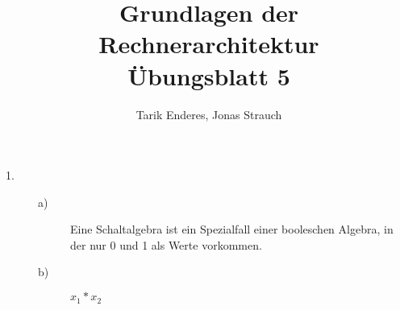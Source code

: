 \documentclass[12pt,a4paper]{scrartcl}
\begin{document}
	\title{Grundlagen der Rechnerarchitektur\\ Übungsblatt 5}
	\date{}
	\author{Tarik Enderes, Jonas Strauch}
	\maketitle
	
	\begin{description}
		\item[1.] 
		\begin{description}
			\item[a)] Eine Schaltalgebra ist ein Spezialfall einer booleschen Algebra, in der nur 0 und 1 als Werte vorkommen.
			\item[b)] 
			\begin{math}
			x_1*x_2
			\end{math}
		\end{description}
	\end{description}
	
\end{document}
